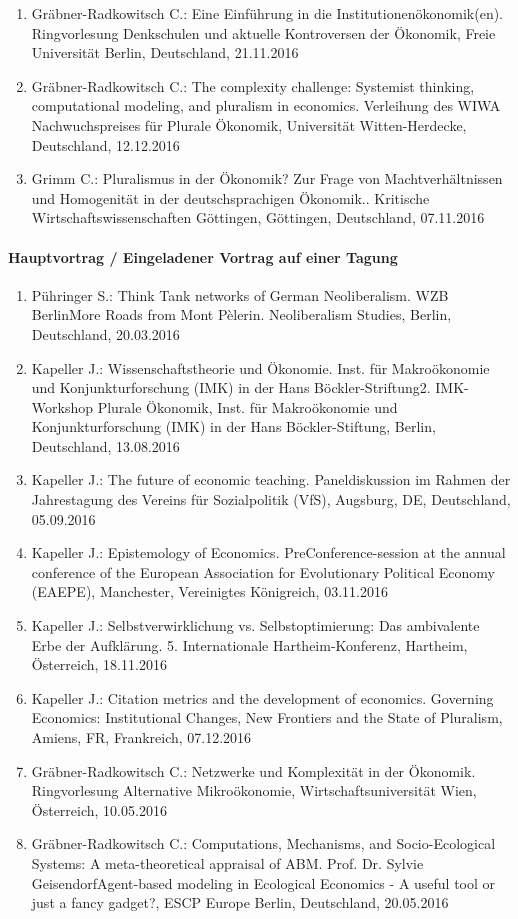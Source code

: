 \begin{enumerate}
	\item Gräbner-Radkowitsch C.: Eine Einführung in die Institutionenökonomik(en). Ringvorlesung \glqq Denkschulen und aktuelle Kontroversen der Ökonomik\grqq{}, Freie Universität Berlin, Deutschland, 21.11.2016
	\item Gräbner-Radkowitsch C.: The complexity challenge: Systemist thinking, computational modeling, and pluralism in economics. Verleihung des WIWA Nachwuchspreises für Plurale Ökonomik, Universität Witten-Herdecke, Deutschland, 12.12.2016
	\item Grimm C.: Pluralismus in der Ökonomik? Zur Frage von Machtverhältnissen und Homogenität in der deutschsprachigen Ökonomik.. Kritische Wirtschaftswissenschaften Göttingen, Göttingen, Deutschland, 07.11.2016
\end{enumerate}
\paragraph{Hauptvortrag / Eingeladener Vortrag auf einer Tagung}
\begin{enumerate}
	\item Pühringer S.: Think Tank networks of German Neoliberalism. WZB BerlinMore Roads from Mont Pèlerin. Neoliberalism Studies, Berlin, Deutschland, 20.03.2016
	\item Kapeller J.: Wissenschaftstheorie und Ökonomie. Inst. für Makroökonomie und  Konjunkturforschung (IMK) in der Hans Böckler-Striftung2. IMK-Workshop \glqq Plurale Ökonomik\grqq{}, Inst. für Makroökonomie und Konjunkturforschung (IMK) in der Hans Böckler-Stiftung, Berlin, Deutschland, 13.08.2016
	\item Kapeller J.: The future of economic teaching. Paneldiskussion im Rahmen der Jahrestagung des Vereins für Sozialpolitik (VfS), Augsburg, DE, Deutschland, 05.09.2016
	\item Kapeller J.: Epistemology of Economics. PreConference-session at the annual conference of the European Association for Evolutionary Political Economy (EAEPE), Manchester, Vereinigtes Königreich, 03.11.2016
	\item Kapeller J.: Selbstverwirklichung vs. Selbstoptimierung: Das ambivalente Erbe der Aufklärung. 5. Internationale Hartheim-Konferenz, Hartheim, Österreich, 18.11.2016
	\item Kapeller J.: Citation metrics and the development of economics. Governing Economics: Institutional Changes, New Frontiers and the State of Pluralism, Amiens, FR, Frankreich, 07.12.2016
	\item Gräbner-Radkowitsch C.: Netzwerke und Komplexität in der Ökonomik. Ringvorlesung \glqq Alternative Mikroökonomie\grqq{}, Wirtschaftsuniversität Wien, Österreich, 10.05.2016
	\item Gräbner-Radkowitsch C.: Computations, Mechanisms, and Socio-Ecological Systems: A meta-theoretical appraisal of ABM. Prof. Dr. Sylvie GeisendorfAgent-based modeling in Ecological Economics - A useful tool or just a fancy gadget?, ESCP Europe Berlin, Deutschland, 20.05.2016
\end{enumerate}
